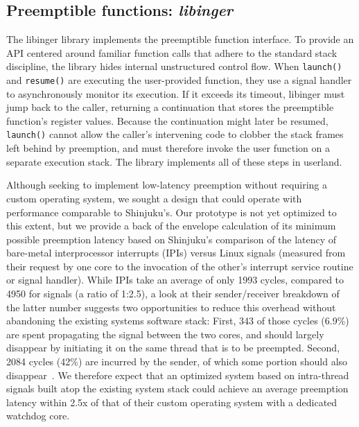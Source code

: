 \subsection{Preemptible functions: \textit{libinger}}
\label{sec:libinger}

The libinger library implements the preemptible function interface.
To provide an API centered around familiar function calls that adhere to the standard
stack discipline, the library hides internal unstructured control flow.
When \texttt{launch()} and \texttt{resume()} are executing the user-provided
function, they use a signal handler to asynchronously monitor its execution.  If
it exceeds its timeout, libinger must jump back to the caller, returning a
continuation that stores the preemptible function's register values.
Because the continuation might later be resumed, \texttt{launch()} cannot allow the
caller's intervening code to clobber the stack frames left behind by preemption, and
must therefore invoke the user function on a separate execution stack.  The library
implements all of these steps in userland.

Although seeking to implement low-latency preemption without requiring a custom
operating system, we sought a design that could operate with performance comparable
to Shinjuku's.  Our prototype is not yet optimized to this extent, but
we provide a back of the envelope calculation of its minimum possible preemption
latency based on Shinjuku's
comparison of the latency of bare-metal interprocessor interrupts (IPIs)
versus Linux signals (measured from their request by one core to the
invocation of the other's interrupt service routine or signal handler).  While
IPIs take an average of only 1993 cycles, compared to 4950 for
signals (a ratio of 1:2.5), a look at their sender/receiver breakdown of the latter
number suggests two opportunities to reduce this overhead without
abandoning the existing systems software stack:  First, 343 of those cycles (6.9\%)
are spent propagating the signal between the two cores, and should largely disappear
by initiating it on the same thread that is to be preempted.  Second, 2084 cycles
(42\%) are incurred by the sender, of which some portion should also
disappear~\cite{Kaffes:nsdi2019}.  We therefore expect that an optimized system based
on intra-thread signals built atop the existing system stack could achieve an
average preemption latency within 2.5x of that of their custom operating
system with a dedicated watchdog core.

